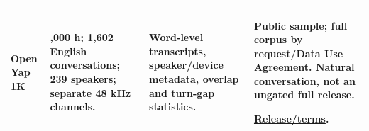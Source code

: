 \begin{table}[H]
\begin{tabular}{@{}>{\raggedright\arraybackslash}p{0.20\tablewidth}>{\raggedright\arraybackslash}p{0.22\tablewidth}>{\raggedright\arraybackslash}p{0.28\tablewidth}>{\raggedright\arraybackslash}p{0.30\tablewidth}@{}}
\addlinespace[4pt]
\textbf{Open Yap 1K}\par\citep{openyap} & 1,000 h; 1,602 English conversations; 239 speakers; separate 48 kHz channels. & Word-level transcripts, speaker/device metadata, overlap and turn-gap statistics. & Public sample; full corpus by request/Data Use Agreement. Natural conversation, not an ungated full release.\par \href{https://github.com/The-Agentic-Data-Co/open-yap-1k}{Release/terms}. \\
\bottomrule
\end{tabular}
\end{table}
